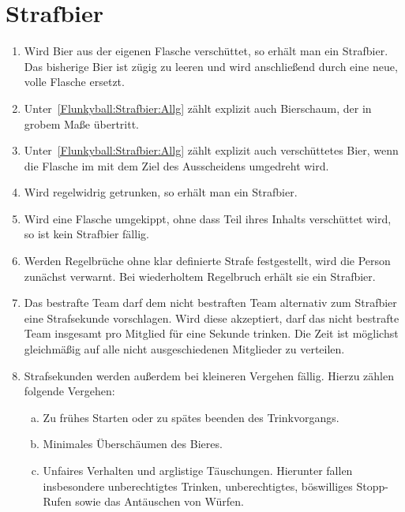 \section{Strafbier}
\begin{enumerate}[label={(\arabic*)}]
    \item\label{Flunkyball:Strafbier:Allg}
    Wird Bier aus der eigenen Flasche verschüttet, so erhält man ein Strafbier.
    Das bisherige Bier ist zügig zu leeren und wird anschließend durch eine neue, volle Flasche ersetzt.

    \item
    Unter~\ref{Flunkyball:Strafbier:Allg} zählt explizit auch Bierschaum, der in grobem Maße übertritt.

    \item
    Unter~\ref{Flunkyball:Strafbier:Allg} zählt explizit auch verschüttetes Bier, wenn die Flasche im mit dem Ziel des Ausscheidens umgedreht wird.

    \item
    Wird regelwidrig getrunken, so erhält man ein Strafbier.

    \item
    Wird eine Flasche umgekippt, ohne dass Teil ihres Inhalts verschüttet wird, so ist kein Strafbier fällig.

    \item
    Werden Regelbrüche ohne klar definierte Strafe festgestellt, wird die Person zunächst verwarnt.
    Bei wiederholtem Regelbruch erhält sie ein Strafbier.

    \item
    Das bestrafte Team darf dem nicht bestraften Team alternativ zum Strafbier eine Strafsekunde vorschlagen.
    Wird diese akzeptiert, darf das nicht bestrafte Team insgesamt pro Mitglied für eine Sekunde trinken.
    Die Zeit ist möglichst gleichmäßig auf alle nicht ausgeschiedenen Mitglieder zu verteilen.

    \item
    Strafsekunden werden außerdem bei kleineren Vergehen fällig.
    Hierzu zählen folgende Vergehen:
    \begin{enumerate}[a.]
        \item
        Zu frühes Starten oder zu spätes beenden des Trinkvorgangs.
        \item
        Minimales Überschäumen des Bieres.
        \item
        Unfaires Verhalten und arglistige Täuschungen.
        Hierunter fallen insbesondere unberechtigtes Trinken, unberechtigtes, böswilliges \glqq{}Stopp\grqq{}-Rufen sowie das Antäuschen von Würfen.
    \end{enumerate}
\end{enumerate}
